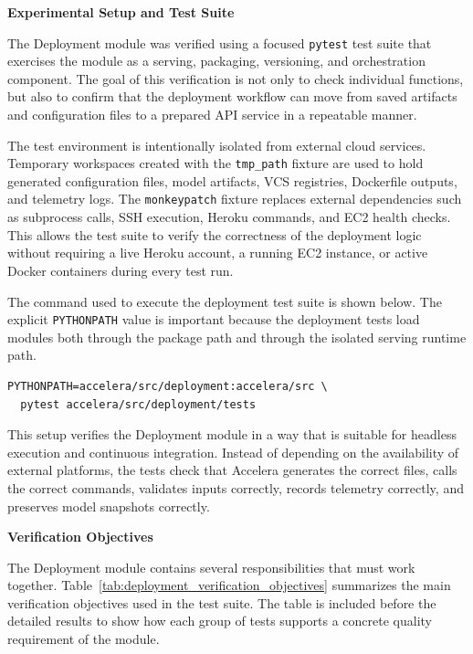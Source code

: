 \medskip
\noindent\textbf{Experimental Setup and Test Suite}\par\smallskip
\noindent The Deployment module was verified using a focused \texttt{pytest}
test suite that exercises the module as a serving, packaging, versioning, and
orchestration component. The goal of this verification is not only to check
individual functions, but also to confirm that the deployment workflow can move
from saved artifacts and configuration files to a prepared API service in a
repeatable manner.

The test environment is intentionally isolated from external cloud services.
Temporary workspaces created with the \texttt{tmp\_path} fixture are used to
hold generated configuration files, model artifacts, VCS registries, Dockerfile
outputs, and telemetry logs. The \texttt{monkeypatch} fixture replaces external
dependencies such as subprocess calls, SSH execution, Heroku commands, and EC2
health checks. This allows the test suite to verify the correctness of the
deployment logic without requiring a live Heroku account, a running EC2
instance, or active Docker containers during every test run.

The command used to execute the deployment test suite is shown below. The
explicit \texttt{PYTHONPATH} value is important because the deployment tests
load modules both through the package path and through the isolated serving
runtime path.

\begin{lstlisting}[style=algostyle,basicstyle=\ttfamily\small,caption={Deployment test-suite execution command},label={alg:deployment_test_command}]
PYTHONPATH=accelera/src/deployment:accelera/src \
  pytest accelera/src/deployment/tests
\end{lstlisting}

This setup verifies the Deployment module in a way that is suitable for
headless execution and continuous integration. Instead of depending on the
availability of external platforms, the tests check that Accelera generates the
correct files, calls the correct commands, validates inputs correctly, records
telemetry correctly, and preserves model snapshots correctly.

\medskip
\noindent\textbf{Verification Objectives}\par\smallskip
\noindent The Deployment module contains several responsibilities that must
work together. Table~\ref{tab:deployment_verification_objectives} summarizes
the main verification objectives used in the test suite. The table is included
before the detailed results to show how each group of tests supports a concrete
quality requirement of the module.

